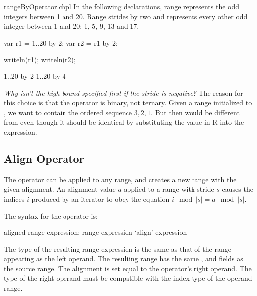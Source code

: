 \begin{chapelexample}{rangeByOperator.chpl}
In the following declarations, range  represents the odd integers
between 1 and 20. Range  strides  by two and represents
every other odd integer between 1 and 20: 1, 5, 9, 13 and 17.
\begin{chapel}
var r1 = 1..20 by 2;
var r2 = r1 by 2;
\end{chapel}
\begin{chapelpost}
writeln(r1);
writeln(r2);
\end{chapelpost}
\begin{chapeloutput}
1..20 by 2
1..20 by 4
\end{chapeloutput}
\end{chapelexample}

\begin{rationale}
{\it Why isn't the high bound specified first if the stride is
negative?}  The reason for this choice is that the  operator
is binary, not ternary.  Given a range  initialized
to , we want  to contain the ordered sequence
$3,2,1$.  But then  would be different from  even though it should be identical by substituting the value in
R into the expression.
\end{rationale}


\subsection{Align Operator}
\label{Align_Operator}

The  operator can be applied to any range, and creates a new range
with the given alignment.  An alignment value $a$ applied to a range with stride $s$ causes the indices $i$ produced by an iterator
to obey the equation $i\!\mod |s| = a\!\mod |s|$.

The syntax for the  operator is:
\begin{syntax}
aligned-range-expression:
  range-expression `align' expression
\end{syntax}
\noindent The type of the resulting range expression is the same as that of the
range appearing as the left operand.  The resulting range has the
same ,  and  fields as the source range. The
alignment is set equal to the  operator's right operand.  The type
of the right operand must be compatible with the index type of the operand range.  

